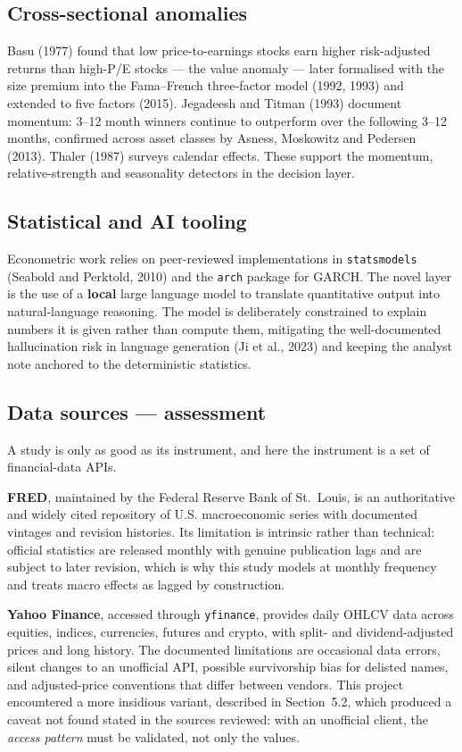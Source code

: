 \documentclass[11pt,a4paper]{article}
\begin{document}
\subsection{Cross-sectional anomalies}

Basu (1977) found that low price-to-earnings stocks earn higher risk-adjusted returns than
high-P/E stocks --- the value anomaly --- later formalised with the size premium into the
Fama--French three-factor model (1992, 1993) and extended to five factors (2015).
Jegadeesh and Titman (1993) document momentum: 3--12 month winners continue to outperform
over the following 3--12 months, confirmed across asset classes by Asness, Moskowitz and
Pedersen (2013). Thaler (1987) surveys calendar effects. These support the momentum,
relative-strength and seasonality detectors in the decision layer.

\subsection{Statistical and AI tooling}

Econometric work relies on peer-reviewed implementations in \texttt{statsmodels} (Seabold
and Perktold, 2010) and the \texttt{arch} package for GARCH. The novel layer is the use of
a \textbf{local} large language model to translate quantitative output into
natural-language reasoning. The model is deliberately constrained to explain numbers it is
given rather than compute them, mitigating the well-documented hallucination risk in
language generation (Ji et al., 2023) and keeping the analyst note anchored to the
deterministic statistics.

\subsection{Data sources --- assessment}

A study is only as good as its instrument, and here the instrument is a set of
financial-data APIs.

\textbf{FRED}, maintained by the Federal Reserve Bank of St.\ Louis, is an authoritative
and widely cited repository of U.S. macroeconomic series with documented vintages and
revision histories. Its limitation is intrinsic rather than technical: official statistics
are released monthly with genuine publication lags and are subject to later revision,
which is why this study models at monthly frequency and treats macro effects as lagged by
construction.

\textbf{Yahoo Finance}, accessed through \texttt{yfinance}, provides daily OHLCV data
across equities, indices, currencies, futures and crypto, with split- and
dividend-adjusted prices and long history. The documented limitations are occasional data
errors, silent changes to an unofficial API, possible survivorship bias for delisted
names, and adjusted-price conventions that differ between vendors. This project
encountered a more insidious variant, described in Section~5.2, which produced a caveat not
found stated in the sources reviewed: with an unofficial client, the \emph{access pattern}
must be validated, not only the values.
\end{document}

